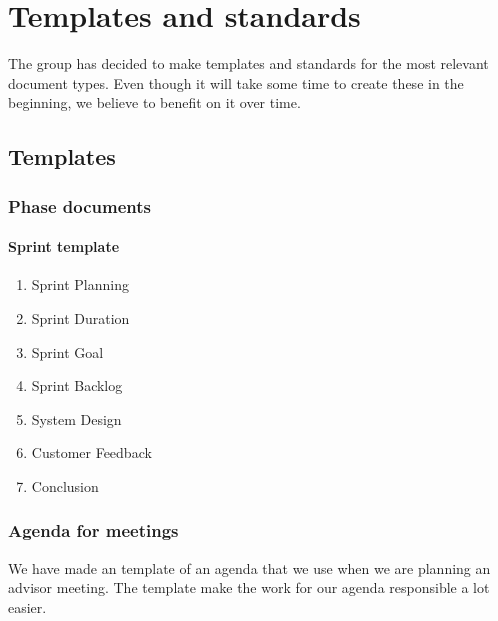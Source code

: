 \section{Templates and standards}
The group has decided to make templates and standards for the most relevant document types. Even though it will take some time to create these in the beginning, we believe to benefit on it over time.

\subsection{Templates}

\subsubsection{Phase documents}

\paragraph{Sprint template}\hfill
\begin{enumerate}
\item{}Sprint Planning
\item{}Sprint Duration
\item{}Sprint Goal
\item{}Sprint Backlog
\item{}System Design
\item{}Customer Feedback
\item{}Conclusion
\end{enumerate}

\subsubsection{Agenda for meetings}
We have made an template of an agenda that we use when we are planning an advisor meeting. The template make the work for our agenda responsible a lot easier.

